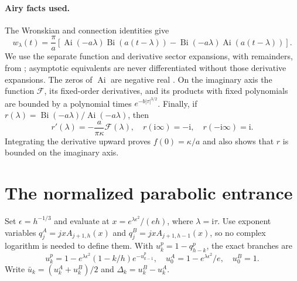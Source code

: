 \documentclass[11pt]{article}
\theoremstyle{remark}\newtheorem{remark}[theorem]{Remark}
\newcommand{\Ai}{\operatorname{Ai}}
\newcommand{\Bi}{\operatorname{Bi}}
\newcommand{\ii}{\mathrm i}
\newcommand{\FF}{\mathcal F}
\begin{document}
\paragraph{Airy facts used.}
The Wronskian and connection identities \cite{dlmf2} give
\begin{equation}\label{xtw:frac:eq:wairy}
 w_\lambda(t)=\frac\pi a\left[
 \Ai(-a\lambda)\Bi(a(t-\lambda))-
 \Bi(-a\lambda)\Ai(a(t-\lambda))\right].
\end{equation}
We use the separate function and derivative sector expansions, with
remainders, from \cite{dlmf7}; asymptotic equivalents are never
differentiated without those derivative expansions. The zeros of $\Ai$
are negative real \cite{dlmf9}. On the imaginary axis the function
$\FF$, its fixed-order derivatives, and its products with fixed polynomials
are bounded by a polynomial times $e^{-b|\tau|^{3/2}}$.
Finally, if $r(\lambda)=\Bi(-a\lambda)/\Ai(-a\lambda)$, then
\[
 r'(\lambda)=-\frac a{\pi\kappa}\FF(\lambda),\quad
 r(\ii\infty)=-\ii,\quad r(-\ii\infty)=\ii.
\]
Integrating the derivative upward proves $f(0)=\kappa/a$ and also shows
that $r$ is bounded on the imaginary axis.

\section{The normalized parabolic entrance}\label{xtw:frac:sec:entrance}
Set $\epsilon=h^{-1/3}$ and evaluate at
$x=e^{\lambda\epsilon^2}/(eh)$, where $\lambda=\ii\tau$.
Use exponent variables $q_j^A=jxA_{j+1,h}(x)$ and
$q_j^B=jxA_{j+1,h-1}(x)$, so no complex logarithm is needed to define them.
With $u_k^p=1-q_{h-k}^p$, the exact branches are
\begin{equation}\label{xtw:frac:eq:recurrence}
 u_k^p=1-e^{\lambda\epsilon^2}(1-k/h)e^{-u_{k-1}^p},\quad
 u_0^A=1-e^{\lambda\epsilon^2}/e,\quad u_0^B=1.
\end{equation}
Write $\bar u_k=(u_k^A+u_k^B)/2$ and
$\Delta_k=u_k^B-u_k^A$.
\end{document}
